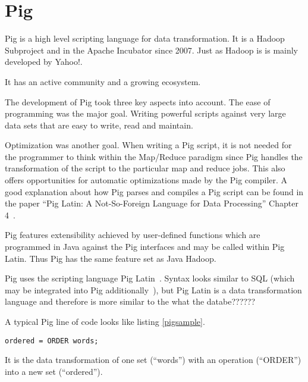 \section{Pig}

Pig is a high level scripting language for data transformation. It is a Hadoop Subproject and in the Apache Incubator since 2007. Just as Hadoop is is mainly developed by Yahoo!. 

It has an active community and a growing ecosystem.

The development of Pig took three key aspects into account. The ease of programming was the major goal. Writing powerful scripts against very large data sets that are easy to write, read and maintain.~\cite{pigWebsite}

Optimization was another goal. When writing a Pig script, it is not needed for the programmer to think within the Map/Reduce paradigm since Pig handles the transformation of the script to the particular map and reduce jobs. This also offers opportunities for automatic optimizations made by the Pig compiler. A good explanation about how Pig parses and compiles a Pig script can be found in the paper ``Pig Latin: A Not-So-Foreign Language for Data Processing'' Chapter 4~\cite{pigNotForeign}.

Pig features extensibility achieved by user-defined functions which are programmed in Java against the Pig interfaces and may be called within Pig Latin. Thus Pig has the same feature set as Java Hadoop.

Pig uses the scripting language Pig Latin~\cite{pigManual}. Syntax looks similar to SQL (which may be integrated into Pig additionally~\cite{pigSql}), but Pig Latin is a data transformation language and therefore is more similar to the what the databe??????  

A typical Pig line of code looks like listing \ref{pigsample}.

\begin{lstlisting}[language=pig,caption=A typical Pig line of code,label=pigsample]
ordered = ORDER words;
\end{lstlisting}

It is the data transformation of one set (``words'') with an operation (``ORDER'') into a new set (``ordered'').
                                                                                                               